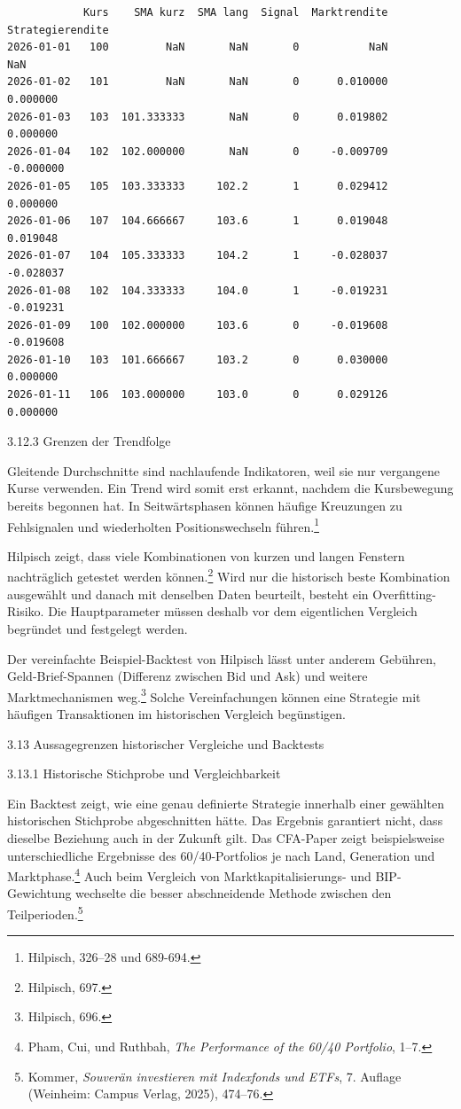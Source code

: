 \documentclass[
  ngerman,
  a4paper,
  DIV=11,
  oneside]{scrreprt}
\begin{document}
\begin{verbatim}
            Kurs    SMA kurz  SMA lang  Signal  Marktrendite  Strategierendite
2026-01-01   100         NaN       NaN       0           NaN               NaN
2026-01-02   101         NaN       NaN       0      0.010000          0.000000
2026-01-03   103  101.333333       NaN       0      0.019802          0.000000
2026-01-04   102  102.000000       NaN       0     -0.009709         -0.000000
2026-01-05   105  103.333333     102.2       1      0.029412          0.000000
2026-01-06   107  104.666667     103.6       1      0.019048          0.019048
2026-01-07   104  105.333333     104.2       1     -0.028037         -0.028037
2026-01-08   102  104.333333     104.0       1     -0.019231         -0.019231
2026-01-09   100  102.000000     103.6       0     -0.019608         -0.019608
2026-01-10   103  101.666667     103.2       0      0.030000          0.000000
2026-01-11   106  103.000000     103.0       0      0.029126          0.000000
\end{verbatim}

3.12.3 Grenzen der Trendfolge

Gleitende Durchschnitte sind nachlaufende Indikatoren, weil sie nur
vergangene Kurse verwenden. Ein Trend wird somit erst erkannt, nachdem
die Kursbewegung bereits begonnen hat. In Seitwärtsphasen können häufige
Kreuzungen zu Fehlsignalen und wiederholten Positionswechseln
führen.\footnote{Hilpisch, 326--28 und 689-694.}

Hilpisch zeigt, dass viele Kombinationen von kurzen und langen Fenstern
nachträglich getestet werden können.\footnote{Hilpisch, 697.} Wird nur
die historisch beste Kombination ausgewählt und danach mit denselben
Daten beurteilt, besteht ein Overfitting-Risiko. Die Hauptparameter
müssen deshalb vor dem eigentlichen Vergleich begründet und festgelegt
werden.

Der vereinfachte Beispiel-Backtest von Hilpisch lässt unter anderem
Gebühren, Geld-Brief-Spannen (Differenz zwischen Bid und Ask) und
weitere Marktmechanismen weg.\footnote{Hilpisch, 696.} Solche
Vereinfachungen können eine Strategie mit häufigen Transaktionen im
historischen Vergleich begünstigen.

3.13 Aussagegrenzen historischer Vergleiche und Backtests

3.13.1 Historische Stichprobe und Vergleichbarkeit

Ein Backtest zeigt, wie eine genau definierte Strategie innerhalb einer
gewählten historischen Stichprobe abgeschnitten hätte. Das Ergebnis
garantiert nicht, dass dieselbe Beziehung auch in der Zukunft gilt. Das
CFA-Paper zeigt beispielsweise unterschiedliche Ergebnisse des
60/40-Portfolios je nach Land, Generation und Marktphase.\footnote{Pham,
  Cui, und Ruthbah, \emph{The {Performance} of the 60/40 {Portfolio}},
  1--7.} Auch beim Vergleich von Marktkapitalisierungs- und
BIP-Gewichtung wechselte die besser abschneidende Methode zwischen den
Teilperioden.\footnote{Kommer, \emph{Souverän investieren mit Indexfonds
  und ETFs}, 7. Auflage (Weinheim: Campus Verlag, 2025), 474--76.}
\end{document}
